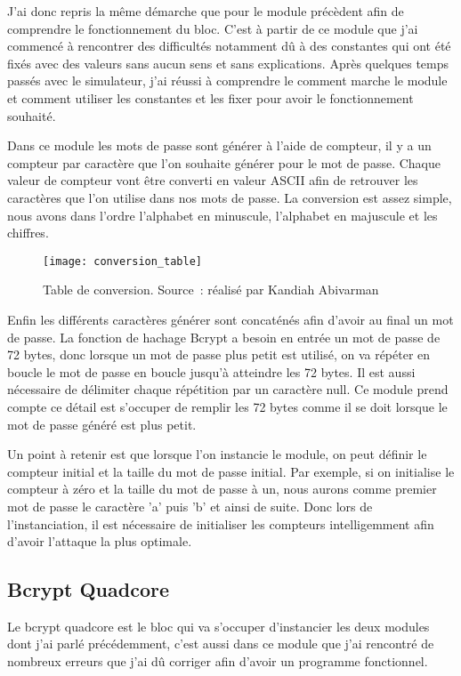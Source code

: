 J'ai donc repris la même démarche que pour le module précèdent afin de comprendre le fonctionnement du bloc. C'est à partir de ce module que j'ai commencé à rencontrer des difficultés notamment dû à des constantes qui ont été fixés avec des valeurs sans aucun sens et sans explications. Après quelques temps passés avec le simulateur, j'ai réussi à comprendre le comment marche le module et comment utiliser les constantes et les fixer pour avoir le fonctionnement souhaité. 

Dans ce module les mots de passe sont générer à l'aide de compteur, il y a un compteur par caractère que l'on souhaite générer pour le mot de passe. Chaque valeur de compteur vont être converti en valeur ASCII afin de retrouver les caractères que l'on utilise dans nos mots de passe. La conversion est assez simple, nous avons dans l'ordre l'alphabet en minuscule, l'alphabet en majuscule et les chiffres. 

\begin{figure}[tbph!]
	\centering
	\texttt{[image: conversion\_table]}
	\caption[Table de conversion]{Table de conversion. Source : réalisé par Kandiah Abivarman}
	\label{fig:conversion_table}
\end{figure}

Enfin les différents caractères générer sont concaténés afin d'avoir au final un mot de passe. La fonction de hachage Bcrypt a besoin en entrée un mot de passe de 72 bytes, donc lorsque un mot de passe plus petit est utilisé, on va répéter en boucle le mot de passe en boucle jusqu'à atteindre les 72 bytes. Il est aussi nécessaire de délimiter chaque répétition par un caractère null. Ce module prend compte ce détail est s'occuper de remplir les 72 bytes comme il se doit lorsque le mot de passe généré est plus petit.

Un point à retenir est que lorsque l'on instancie le module, on peut définir le compteur initial et la taille du mot de passe initial. Par exemple, si on initialise le compteur à zéro et la taille du mot de passe à un, nous aurons comme premier mot de passe le caractère 'a' puis 'b' et ainsi de suite. Donc lors de l'instanciation, il est nécessaire de initialiser les compteurs intelligemment afin d'avoir l'attaque la plus optimale.

\subsection{Bcrypt Quadcore}

Le bcrypt quadcore est le bloc qui va s'occuper d'instancier les deux modules dont j'ai parlé précédemment, c'est aussi dans ce module que j'ai rencontré de nombreux erreurs que j'ai dû corriger afin d'avoir un programme fonctionnel.

